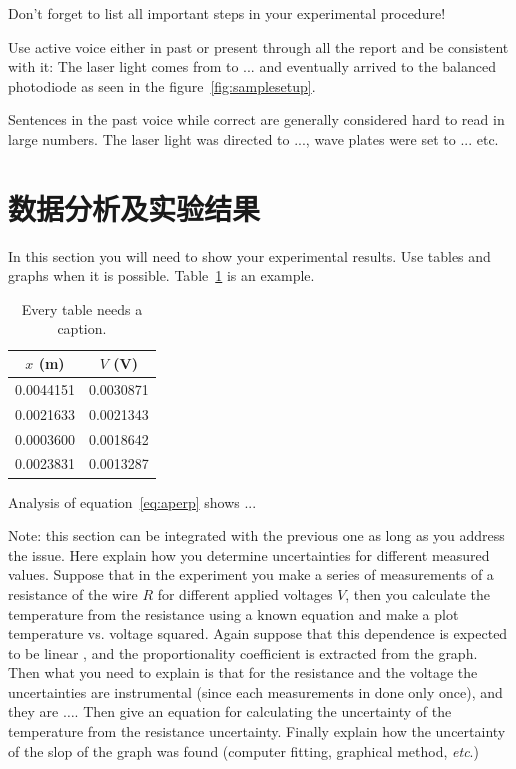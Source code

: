 \documentclass[UTF8,a4paper,12pt]{article}
\begin{document}
Don't forget to list all important steps in your experimental procedure!

Use active voice either in past or present through all the report and be
consistent with it:
The laser light comes  from to ... and eventually arrived to the
balanced photodiode as seen in the figure~\ref{fig:samplesetup}.

Sentences in the past voice while correct are generally considered hard to read
in large numbers. The laser light was directed to ..., wave plates were set
to ... etc.


\section{数据分析及实验结果}

In this section you will need to show your experimental results. Use tables and
graphs when it is possible. Table~\ref{tbl:bins} is an example.

\begin{table}[ht]
\begin{center}
\caption{Every table needs a caption.}
\label{tbl:bins} %
\begin{tabular}{|cc|} 
\hline
\multicolumn{1}{|c}{$x$ (m)} & \multicolumn{1}{c|}{$V$ (V)} \\
\hline
0.0044151 &   0.0030871 \\
0.0021633 &   0.0021343 \\
0.0003600 &   0.0018642 \\
0.0023831 &   0.0013287 \\
\hline
\end{tabular}
\end{center}
\end{table}

Analysis of equation~\ref{eq:aperp} shows ...

Note: this section can be integrated with the previous one as long as you
address the issue. Here explain how you determine uncertainties for different
measured values. Suppose that in the experiment you make a series of
measurements of a resistance of the wire $R$ for different applied voltages
$V$, then you calculate the temperature from the resistance using a known
equation and make a plot  temperature vs. voltage squared. Again suppose that
this dependence is expected to be linear%
, and the proportionality coefficient
is extracted from the graph. Then what you need to explain is that for the
resistance and the voltage the uncertainties are instrumental (since each
measurements in done only once), and they are $\dots$. Then give an equation
for calculating the uncertainty of the temperature from the resistance
uncertainty. Finally explain how the uncertainty of the slop of the graph was
found (computer fitting, graphical\cite{kiker2006qnd} method, \emph{etc}.)
\end{document}
